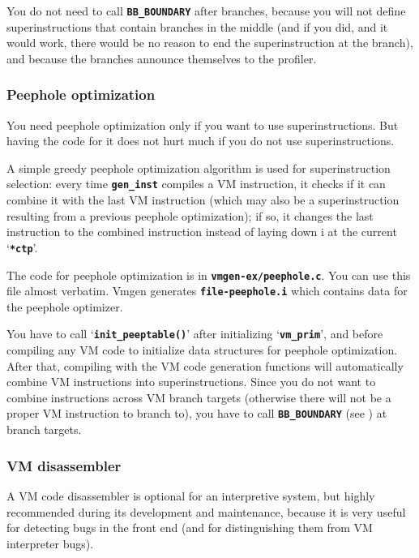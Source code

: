 \documentclass[10pt,english]{article}
\begin{document}
You do not need to call \texttt{\textbf{BB\_BOUNDARY}} after branches,
because you will not define superinstructions that contain branches
in the middle (and if you did, and it would work, there would be no
reason to end the superinstruction at the branch), and because the
branches announce themselves to the profiler.


\subsubsection{Peephole optimization\label{sub:Peephole-optimization}}

You need peephole optimization only if you want to use superinstructions.
But having the code for it does not hurt much if you do not use superinstructions.

A simple greedy peephole optimization algorithm is used for superinstruction
selection: every time \texttt{\textbf{gen\_inst}} compiles a VM instruction,
it checks if it can combine it with the last VM instruction (which
may also be a superinstruction resulting from a previous peephole
optimization); if so, it changes the last instruction to the combined
instruction instead of laying down i at the current \textquoteleft{}\texttt{\textbf{{*}ctp}}\textquoteright{}.

The code for peephole optimization is in \texttt{\textbf{vmgen-ex/peephole.c}}.
You can use this file almost verbatim. Vmgen generates \texttt{\textbf{file-peephole.i}}
which contains data for the peephole optimizer.

You have to call \textquoteleft{}\texttt{\textbf{init\_peeptable()}}\textquoteright{}
after initializing \textquoteleft{}\texttt{\textbf{vm\_prim}}\textquoteright{},
and before compiling any VM code to initialize data structures for
peephole optimization. After that, compiling with the VM code generation
functions will automatically combine VM instructions into superinstructions.
Since you do not want to combine instructions across VM branch targets
(otherwise there will not be a proper VM instruction to branch to),
you have to call \texttt{\textbf{BB\_BOUNDARY}} (see )
at branch targets.


\subsubsection{VM disassembler\label{sub:VM-disassembler}}

A VM code disassembler is optional for an interpretive system, but
highly recommended during its development and maintenance, because
it is very useful for detecting bugs in the front end (and for distinguishing
them from VM interpreter bugs).
\end{document}
